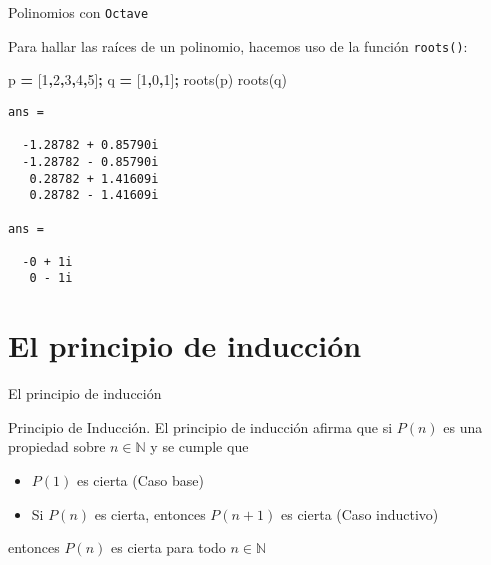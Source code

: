 \documentclass[
  ignorenonframetext,
]{beamer}
\newenvironment{Shaded}{\begin{snugshade}}{\end{snugshade}}
\newcommand{\FloatTok}[1]{\textcolor[rgb]{0.00,0.00,0.81}{#1}}
\newcommand{\FunctionTok}[1]{\textcolor[rgb]{0.00,0.00,0.00}{#1}}
\newcommand{\NormalTok}[1]{#1}
\newcommand{\OperatorTok}[1]{\textcolor[rgb]{0.81,0.36,0.00}{\textbf{#1}}}
\providecommand{\tightlist}{%
  \setlength{\itemsep}{0pt}\setlength{\parskip}{0pt}}
\begin{document}
\begin{frame}[fragile]{Polinomios con \texttt{Octave}}
\protect\hypertarget{polinomios-con-octave-9}{}

Para hallar las raíces de un polinomio, hacemos uso de la función
\texttt{roots()}:

\begin{Shaded}
\begin{Highlighting}[]
\NormalTok{p }\OperatorTok{=}\NormalTok{ [}\FloatTok{1}\OperatorTok{,}\FloatTok{2}\OperatorTok{,}\FloatTok{3}\OperatorTok{,}\FloatTok{4}\OperatorTok{,}\FloatTok{5}\NormalTok{]}\OperatorTok{;}
\NormalTok{q }\OperatorTok{=}\NormalTok{ [}\FloatTok{1}\OperatorTok{,}\FloatTok{0}\OperatorTok{,}\FloatTok{1}\NormalTok{]}\OperatorTok{;}
\FunctionTok{roots}\NormalTok{(p)}
\FunctionTok{roots}\NormalTok{(q)}
\end{Highlighting}
\end{Shaded}

\begin{verbatim}
ans =

  -1.28782 + 0.85790i
  -1.28782 - 0.85790i
   0.28782 + 1.41609i
   0.28782 - 1.41609i

ans =

  -0 + 1i
   0 - 1i
\end{verbatim}

\end{frame}

\hypertarget{el-principio-de-inducciuxf3n}{%
\section{El principio de inducción}\label{el-principio-de-inducciuxf3n}}

\begin{frame}{El principio de inducción}
\protect\hypertarget{el-principio-de-inducciuxf3n-1}{}

Principio de Inducción. El principio de inducción afirma que si \(P(n)\)
es una propiedad sobre \(n\in\mathbb{N}\) y se cumple que

\begin{itemize}
\tightlist
\item
  \(P(1)\) es cierta (Caso base)
\item
  Si \(P(n)\) es cierta, entonces \(P(n+1)\) es cierta (Caso inductivo)
\end{itemize}

entonces \(P(n)\) es cierta para todo \(n\in\mathbb{N}\)

\end{frame}
\end{document}
